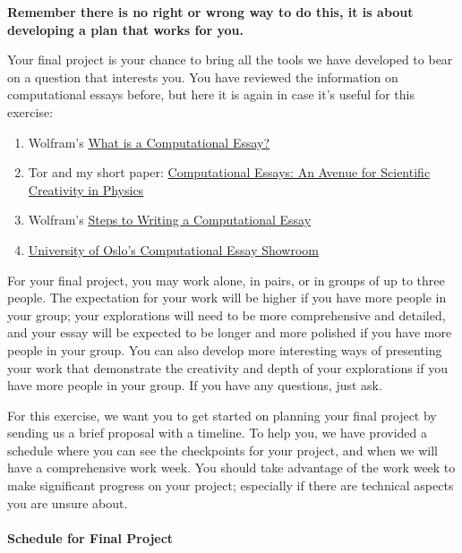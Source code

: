 \documentclass[11pt]{article}
\providecommand{\tightlist}{%
      \setlength{\itemsep}{0pt}\setlength{\parskip}{0pt}}
\begin{document}
\textbf{Remember there is no right or wrong way to do this, it is about
developing a plan that works for you.}

Your final project is your chance to bring all the tools we have
developed to bear on a question that interests you. You have reviewed
the information on computational essays before, but here it is again in
case it's useful for this exercise:

\begin{enumerate}
\def\labelenumi{\arabic{enumi}.}
\tightlist
\item
  Wolfram's
  \href{https://writings.stephenwolfram.com/2017/11/what-is-a-computational-essay}{What
  is a Computational Essay?}
\item
  Tor and my short paper:
  \href{https://arxiv.org/abs/1909.12697}{Computational Essays: An
  Avenue for Scientific Creativity in Physics}
\item
  Wolfram's
  \href{https://www.wolframcloud.com/obj/Expositions/Published/ComputationalEssayGuidelines}{Steps
  to Writing a Computational Essay}
\item
  \href{https://uio-ccse.github.io/computational-essay-showroom}{University
  of Oslo's Computational Essay Showroom}
\end{enumerate}

For your final project, you may work alone, in pairs, or in groups of up
to three people. The expectation for your work will be higher if you
have more people in your group; your explorations will need to be more
comprehensive and detailed, and your essay will be expected to be longer
and more polished if you have more people in your group. You can also
develop more interesting ways of presenting your work that demonstrate
the creativity and depth of your explorations if you have more people in
your group. If you have any questions, just ask.

For this exercise, we want you to get started on planning your final
project by sending us a brief proposal with a timeline. To help you, we
have provided a schedule where you can see the checkpoints for your
project, and when we will have a comprehensive work week. You should
take advantage of the work week to make significant progress on your
project; especially if there are technical aspects you are unsure about.

\paragraph{Schedule for Final Project}\label{schedule-for-final-project}
\end{document}
